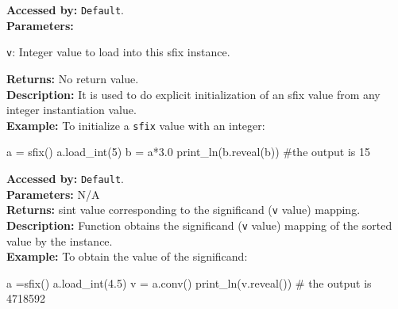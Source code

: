 			\textbf{Accessed by:} \verb|Default|.		 \\
			\textbf{Parameters:}
			\begin{description}
				\item \verb|v|: Integer value to load into this sfix instance.
			\end{description}
			\textbf{Returns:} No return value. \\
			\textbf{Description:}
				 It is used to do explicit initialization of an sfix value from any integer instantiation value. \\
	     	\textbf{Example:}
    		    To initialize a \verb|sfix| value with an integer:
		     	\begin{mylisting}
				a = sfix()
				a.load_int(5)
				b = a*3.0
				print_ln(b.reveal(b))  #the output is 15   	
     			\end{mylisting}	 
			\textbf{Accessed by:} \verb|Default|.		 \\
			\textbf{Parameters:} N/A \\
			\textbf{Returns:} sint value corresponding to the significand (\verb|v| value) mapping. \\
			\textbf{Description:}
				Function obtains the significand (\verb|v| value) mapping of the sorted value by the instance. \\
	     	\textbf{Example:}
    		    To obtain the value of the significand:
		     	\begin{mylisting}
				a =sfix()
				a.load_int(4.5)
				v = a.conv()
				print_ln(v.reveal())  # the output is 4718592   	
     			\end{mylisting}	 
		
